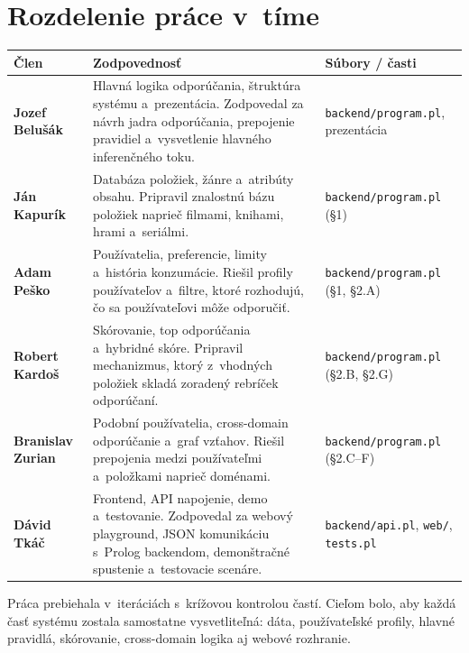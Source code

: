\documentclass[11pt,a4paper]{article}
\begin{document}
\section{Rozdelenie práce v~tíme}

\begin{center}
\begin{tabular}{>{\bfseries}p{3.4cm}p{8.1cm}p{3.2cm}}
\toprule
Člen & Zodpovednosť & Súbory / časti\\
\midrule
Jozef Belušák &
Hlavná logika odporúčania, štruktúra systému a~prezentácia.
Zodpovedal za návrh jadra odporúčania, prepojenie pravidiel
a~vysvetlenie hlavného inferenčného toku. &
\texttt{backend/program.pl}, prezentácia\\

Ján Kapurík &
Databáza položiek, žánre a~atribúty obsahu. Pripravil znalostnú
bázu položiek naprieč filmami, knihami, hrami a~seriálmi. &
\texttt{backend/program.pl} (§1)\\

Adam Peško &
Používatelia, preferencie, limity a~história konzumácie. Riešil
profily používateľov a~filtre, ktoré rozhodujú, čo sa používateľovi
môže odporučiť. &
\texttt{backend/program.pl} (§1, §2.A)\\

Robert Kardoš &
Skórovanie, top odporúčania a~hybridné skóre. Pripravil mechanizmus,
ktorý z~vhodných položiek skladá zoradený rebríček odporúčaní. &
\texttt{backend/program.pl} (§2.B, §2.G)\\

Branislav Zurian &
Podobní používatelia, cross-domain odporúčanie a~graf vzťahov.
Riešil prepojenia medzi používateľmi a~položkami naprieč doménami. &
\texttt{backend/program.pl} (§2.C--F)\\

Dávid Tkáč &
Frontend, API napojenie, demo a~testovanie. Zodpovedal za webový
playground, JSON komunikáciu s~Prolog backendom, demonštračné
spustenie a~testovacie scenáre. &
\texttt{backend/api.pl}, \texttt{web/}, \texttt{tests.pl}\\
\bottomrule
\end{tabular}
\end{center}

Práca prebiehala v~iteráciách s~krížovou kontrolou častí. Cieľom
bolo, aby každá časť systému zostala samostatne vysvetliteľná:
dáta, používateľské profily, hlavné pravidlá, skórovanie,
cross-domain logika aj webové rozhranie.
\end{document}
